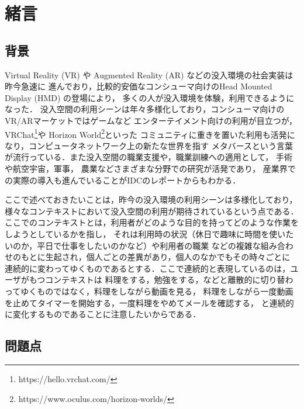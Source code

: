 \chapter{緒言}

\section{背景}

Virtual Reality (VR) や Augmented Reality (AR) などの没入環境の社会実装は昨今急速に
進んでおり，比較的安価なコンシューマ向けのHead Mounted Display (HMD) の登場により，
多くの人が没入環境を体験，利用できるようになった．
没入空間の利用シーンは年々多様化しており，コンシューマ向けのVR/ARマーケットではゲームなど
エンターテイメント向けの利用が目立つが，VRChat\footnote{https://hello.vrchat.com/}や
Horizon World\footnote{https://www.oculus.com/horizon-worlds/}といった
コミュニティに重きを置いた利用も活発になり，コンピュータネットワーク上の新たな世界を指す
メタバースという言葉が流行っている．また没入空間の職業支援や，職業訓練への適用として，
手術\cite{Gallagher2005-gv}や航空宇宙\cite{aerospace}，軍事\cite{military}，
農業\cite{agriculture}などさまざまな分野での研究が活発であり，
産業界での実際の導入も進んでいることがIDCのレポート\cite{idc-2022}からもわかる．

ここで述べておきたいことは，昨今の没入環境の利用シーンは多様化しており，
様々なコンテキストにおいて没入空間の利用が期待されているという点である．
ここでのコンテキストとは，利用者がどのような目的を持ってどのような作業をしようとしているかを指し，
それは利用時の状況（休日で趣味に時間を使いたいのか，平日で仕事をしたいのかなど）や利用者の職業
などの複雑な組み合わせのもとに生起され，個人ごとの差異があり，個人のなかでもその時々ごとに
連続的に変わってゆくものであるとする．ここで連続的と表現しているのは，ユーザがもつコンテキストは
料理をする，勉強をする，などと離散的に切り替わってゆくものではなく，料理をしながら動画を見る，
料理をしながら一度動画を止めてタイマーを開始する，一度料理をやめてメールを確認する，
と連続的に変化するものであることに注意したいからである．


\section{問題点}
\label{section:intro:problem}

